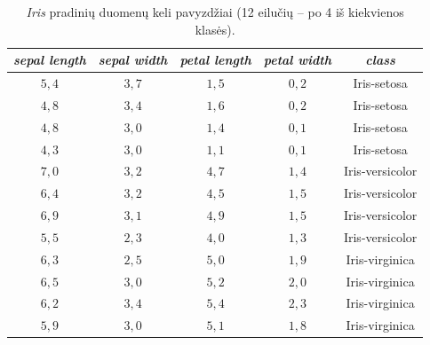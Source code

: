 \begin{table}[H]
    \centering
    \caption{\textit{Iris} pradinių duomenų keli pavyzdžiai (12 eilučių – po 4 iš kiekvienos klasės).}
    \begin{tabular}{|c|c|c|c|c|}
        \hline
        \textit{sepal length} & \textit{sepal width} & \textit{petal length} & \textit{petal width} & \textit{class} \\
        \hline
        $5{,}4$ & $3{,}7$ & $1{,}5$ & $0{,}2$ & Iris-setosa \\ \hline
        $4{,}8$ & $3{,}4$ & $1{,}6$ & $0{,}2$ & Iris-setosa \\ \hline
        $4{,}8$ & $3{,}0$ & $1{,}4$ & $0{,}1$ & Iris-setosa \\ \hline
        $4{,}3$ & $3{,}0$ & $1{,}1$ & $0{,}1$ & Iris-setosa \\ \hline
        $7{,}0$ & $3{,}2$ & $4{,}7$ & $1{,}4$ & Iris-versicolor \\ \hline
        $6{,}4$ & $3{,}2$ & $4{,}5$ & $1{,}5$ & Iris-versicolor \\ \hline
        $6{,}9$ & $3{,}1$ & $4{,}9$ & $1{,}5$ & Iris-versicolor \\ \hline
        $5{,}5$ & $2{,}3$ & $4{,}0$ & $1{,}3$ & Iris-versicolor \\ \hline
        $6{,}3$ & $2{,}5$ & $5{,}0$ & $1{,}9$ & Iris-virginica \\ \hline
        $6{,}5$ & $3{,}0$ & $5{,}2$ & $2{,}0$ & Iris-virginica \\ \hline
        $6{,}2$ & $3{,}4$ & $5{,}4$ & $2{,}3$ & Iris-virginica \\ \hline
        $5{,}9$ & $3{,}0$ & $5{,}1$ & $1{,}8$ & Iris-virginica \\ \hline
    \end{tabular}
    \label{tab:iris_pradiniai_duomenys}
\end{table}